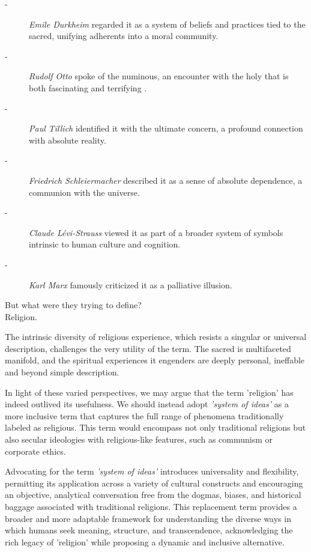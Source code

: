 \documentclass[11pt,a4]{article}
\begin{document}
\begin{description}
    \item[-] \textit{Emile Durkheim} regarded it as a system of beliefs and practices tied to the sacred, unifying adherents into a moral community.
    \item[-] \textit{Rudolf Otto} spoke of the numinous, an encounter with the holy that is both fascinating and terrifying \cite{Otto1996-in}.
    \item[-] \textit{Paul Tillich} identified it with the ultimate concern, a profound connection with absolute reality.
    \item[-] \textit{Friedrich Schleiermacher} described it as a sense of absolute dependence, a communion with the universe.
    \item[-] \textit{Claude Lévi-Strauss} viewed it as part of a broader system of symbols intrinsic to human culture and cognition.
    \item[-] \textit{Karl Marx} famously criticized it as a palliative illusion.
\end{description}    

But what were they trying to define?\\
Religion.
 
 \par
The intrinsic diversity of religious experience, which resists a singular or universal description, challenges the very utility of the term. The sacred is multifaceted manifold, and the spiritual experiences it engenders are deeply personal, ineffable and beyond simple description.

\par
In light of these varied perspectives, we may argue that the term 'religion' has indeed outlived its usefulness. We should instead adopt \textit{'system of ideas'} as a more inclusive term that captures the full range of phenomena traditionally labeled as religious. This term would encompass not only traditional religions but also secular ideologies with religious-like features, such as communism or corporate ethics.

\par
Advocating for the term \textit{'system of ideas'} introduces universality and flexibility, permitting its application across a variety of cultural constructs and encouraging an objective, analytical conversation free from the dogmas, biases, and historical baggage associated with traditional religions. This replacement term provides a broader and more adaptable framework for understanding the diverse ways in which humans seek meaning, structure, and transcendence, acknowledging the rich legacy of 'religion' while proposing a dynamic and inclusive alternative.
\end{document}
